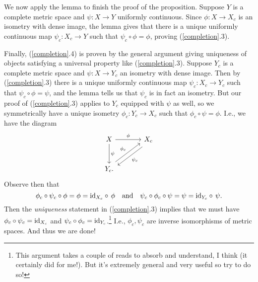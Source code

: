 \begin{nothing}
  We now apply the lemma to finish the proof of the proposition. Suppose
  $Y$ is a complete metric space and $\psi : X \to Y$ uniformly
  continuous. Since $\phi : X \to X_c$ is an isometry with dense image,
  the lemma gives that there is a unique uniformly continuous map
  $\psi_c : X_c \to Y$ such that $\psi_c \circ \phi = \phi$, proving
  (\ref{completion}.3).

  Finally, (\ref{completion}.4) is proven by the general argument giving
  uniqueness of objects satisfying a universal property like
  (\ref{completion}.3). Suppose $Y_c$ is a complete metric space and
  $\psi : X \to Y_c$ an isometry with dense image. Then by
  (\ref{completion}.3) there is a unique uniformly continuous map
  $\psi_c : X_c \to Y_c$ such that $\psi_c \circ \phi = \psi$, and the
  lemma tells us that $\psi_c$ is in fact an isometry. But our proof of
  (\ref{completion}.3) applies to $Y_c$ equipped with $\psi$ as well, so
  we symmetrically have a unique isometry $\phi_c : Y_c \to X_c$ such
  that $\phi_c \circ \psi = \phi$. I.e., we have the diagram
  \[
  \begin{tikzcd}[column sep = large, row sep = large]
    X \rar{\phi} \dar{\psi} & X_c \ar[shift left = .7ex]{dl}{\psi_c}
    \\ Y_c \ar[shift left = .7ex]{ur}{\phi_c}.
  \end{tikzcd}
  \]
  Observe then that
  \[
  \phi_c \circ \psi_c \circ \phi = \phi = \mathrm{id}_{X_c} \circ\, \phi
  \quad\text{and}\quad \psi_c \circ \phi_c \circ \psi = \psi = \mathrm{id}_{Y_c}
  \circ\, \psi.
  \]
  Then the \textit{uniqueness} statement in (\ref{completion}.3) implies
  that we must have $\phi_c \circ \psi_c = \mathrm{id}_{X_c}$ and $\psi_c \circ
  \phi_c = \mathrm{id}_{Y_c}$.\footnote{This argument takes a couple of reads to
    absorb and understand, I think (it certainly did for me!). But it's
    extremely general and very useful so try to do so!} I.e.,
  $\phi_c,\psi_c$ are inverse isomorphisms of metric spaces. And thus we
  are done!
\end{nothing}


